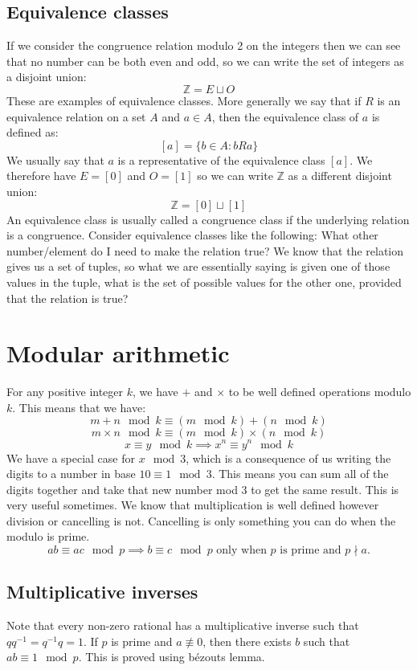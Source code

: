 \documentclass[12pt]{article}
\begin{document}
\subsection*{Equivalence classes}
If we consider the congruence relation modulo 2 on the integers then we can see that no number can be both even and odd, so we can write the set of integers as a disjoint union:
\[\mathbb{Z}=E\sqcup O\]
These are examples of equivalence classes. More generally we say that if \(R\) is an equivalence relation on a set \(A\) and \(a\in A\), then the equivalence class of \(a\) is defined as:
\[[a]=\{b\in A:bRa\}\]
We usually say that \(a\) is a representative of the equivalence class \([a]\). We therefore have \(E=[0]\) and \(O=[1]\) so we can write \(\mathbb{Z}\) as a different disjoint union:
\[\mathbb{Z}=[0]\sqcup [1]\]
An equivalence class is usually called a congruence class if the underlying relation is a congruence. Consider equivalence classes like the following: What other number/element do I need to make the relation true? We know that the relation gives us a set of tuples, so what we are essentially saying is given one of those values in the tuple, what is the set of possible values for the other one, provided that the relation is true?
\section{Modular arithmetic}
For any positive integer \(k\), we have \(+\) and \(\times\) to be well defined operations modulo \(k\). This means that we have:
\[m+n\mod{k}\equiv (m\mod{k})+(n\mod{k})\]
\[m\times n\mod{k}\equiv (m\mod{k})\times(n\mod{k})\]
\[x\equiv y\mod{k}\implies x^n\equiv y^n\mod{k}\]
We have a special case for \(x\mod{3}\), which is a consequence of us writing the digits to a number in base \(10\equiv1\mod{3}\). This means you can sum all of the digits together and take that new number mod 3 to get the same result. This is very useful sometimes. We know that multiplication is well defined however division or cancelling is not. Cancelling is only something you can do when the modulo is prime.
\[ab\equiv ac\mod{p}\implies b\equiv c\mod{p}\text{ only when }p \text{ is prime and }p\nmid a.\]
\subsection*{Multiplicative inverses}
Note that every non-zero rational has a multiplicative inverse such that \(qq^{-1}=q^{-1}q=1\). If \(p\) is prime and \(a\not \equiv 0\), then there exists \(b\) such that \(ab\equiv1\mod{p}\). This is proved using b\'ezouts lemma.
\end{document}

